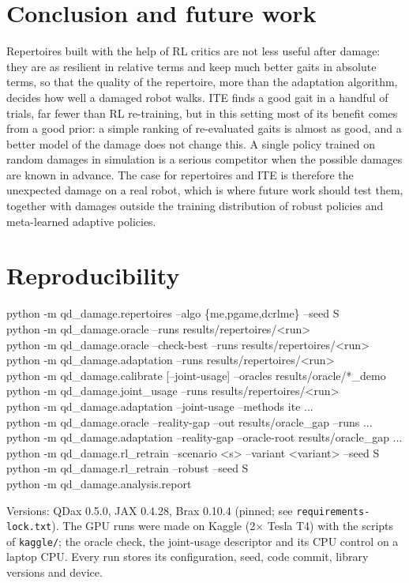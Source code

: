 \documentclass[11pt,a4paper]{article}
\begin{document}
\section{Conclusion and future work}
Repertoires built with the help of RL critics are not less useful after damage: they are as resilient in relative
terms and keep much better gaits in absolute terms, so that the quality of the repertoire, more than the adaptation
algorithm, decides how well a damaged robot walks. ITE finds a good gait in a handful of trials, far fewer than RL
re-training, but in this setting most of its benefit comes from a good prior: a simple ranking of re-evaluated gaits
is almost as good, and a better model of the damage does not change this. A single policy trained on random damages in
simulation is a serious competitor when the possible damages are known in advance. The case for repertoires and ITE is
therefore the unexpected damage on a real robot, which is where future work should test them, together with damages
outside the training distribution of robust policies and meta-learned adaptive policies.

\small



\normalsize
\appendix
\section{Reproducibility}
\begin{footnotesize}\ttfamily\noindent
python -m qd\_damage.repertoires --algo \{me,pgame,dcrlme\} --seed S\\
python -m qd\_damage.oracle --runs results/repertoires/<run>\\
python -m qd\_damage.oracle --check-best --runs results/repertoires/<run>\\
python -m qd\_damage.adaptation --runs results/repertoires/<run>\\
python -m qd\_damage.calibrate [--joint-usage] --oracles results/oracle/*\_demo\\
python -m qd\_damage.joint\_usage --runs results/repertoires/<run>\\
python -m qd\_damage.adaptation --joint-usage --methods ite ...\\
python -m qd\_damage.oracle --reality-gap --out results/oracle\_gap --runs ...\\
python -m qd\_damage.adaptation --reality-gap --oracle-root results/oracle\_gap ...\\
python -m qd\_damage.rl\_retrain --scenario <s> --variant <variant> --seed S\\
python -m qd\_damage.rl\_retrain --robust --seed S\\
python -m qd\_damage.analysis.report
\end{footnotesize}

Versions: QDax 0.5.0, JAX 0.4.28, Brax 0.10.4 (pinned; see \texttt{requirements-lock.txt}). The GPU runs were made on
Kaggle (2$\times$ Tesla T4) with the scripts of \texttt{kaggle/}; the oracle check, the joint-usage descriptor and its
CPU control on a laptop CPU. Every run stores its configuration, seed, code commit, library versions and device.
\end{document}
